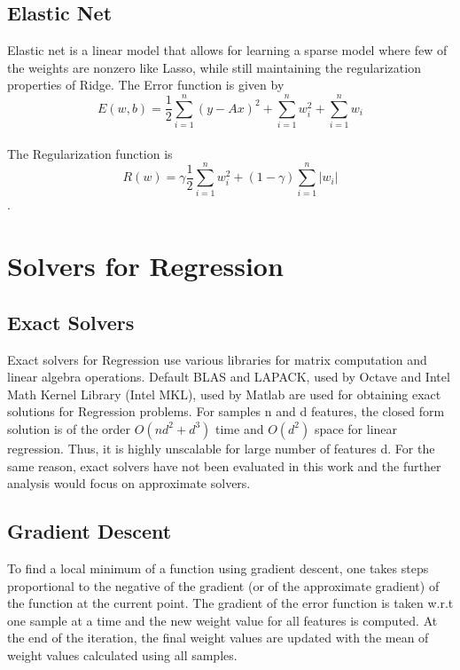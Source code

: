\documentclass{sigplanconf}
\begin{document}
\subsection{Elastic Net}
Elastic net is a linear model that allows for learning a sparse model where few of the weights are nonzero
like Lasso, while still maintaining the regularization properties of Ridge. The Error function is given by
\begin{equation}E(w,b) =\frac{1}{2} \sum_{i=1}^{n} (y-Ax)^2 + \sum_{i=1}^{n} w_i^2 + \sum_{i=1}^{n} w_i \end{equation} \\
The Regularization function is
\begin{equation}R(w) = \gamma \frac{1}{2} \sum_{i=1}^{n} w_i^2 + (1-\gamma)\sum_{i=1}^{n} |w_i|\end{equation}.

\section{Solvers for Regression}
\subsection{Exact Solvers}
Exact solvers for Regression use various libraries for matrix computation and linear algebra operations.
Default BLAS \cite{blas} and LAPACK, used by Octave and Intel Math Kernel Library (Intel MKL), used by Matlab
are used for obtaining exact solutions for Regression problems. For samples n and d features, the closed form
solution is of the order \begin {math} O(nd^2 + d^3) \end {math} time and \begin {math} O(d^2) \end {math} space for linear regression.
Thus, it is highly unscalable for large number of features d. For the same reason, exact solvers have not been
evaluated in this work and the further analysis would focus on approximate solvers.

\subsection{Gradient Descent}
To find a local minimum of a function using gradient descent, one takes steps proportional to the negative of 
the gradient (or of the approximate gradient) of the function at the current point. The gradient of the error 
function is taken w.r.t one sample at a time and the new weight value for all features is computed.
At the end of the iteration, the final weight values are updated with the mean of weight values calculated using all samples.
\end{document}
